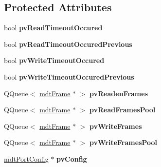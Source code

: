 \subsection*{Protected Attributes}
\begin{DoxyCompactItemize}
\item 
\hypertarget{classmdt_abstract_port_a9faa5966fcf4232b3d25034c0f67dd7c}{
bool {\bfseries pvReadTimeoutOccured}}
\label{classmdt_abstract_port_a9faa5966fcf4232b3d25034c0f67dd7c}

\item 
\hypertarget{classmdt_abstract_port_a2530e291d5ae4c1584595f9a5df7e9ff}{
bool {\bfseries pvReadTimeoutOccuredPrevious}}
\label{classmdt_abstract_port_a2530e291d5ae4c1584595f9a5df7e9ff}

\item 
\hypertarget{classmdt_abstract_port_ae5a003d280237700c8aa3cb6184e2d1b}{
bool {\bfseries pvWriteTimeoutOccured}}
\label{classmdt_abstract_port_ae5a003d280237700c8aa3cb6184e2d1b}

\item 
\hypertarget{classmdt_abstract_port_a8b65c0e26dc13147f02571ba74bef539}{
bool {\bfseries pvWriteTimeoutOccuredPrevious}}
\label{classmdt_abstract_port_a8b65c0e26dc13147f02571ba74bef539}

\item 
\hypertarget{classmdt_abstract_port_a412c3e4903bf7d90914cfeb273e82623}{
QQueue$<$ \hyperlink{classmdt_frame}{mdtFrame} $\ast$ $>$ {\bfseries pvReadenFrames}}
\label{classmdt_abstract_port_a412c3e4903bf7d90914cfeb273e82623}

\item 
\hypertarget{classmdt_abstract_port_a3d6bb9b420f64776d8fd077cf2b9b873}{
QQueue$<$ \hyperlink{classmdt_frame}{mdtFrame} $\ast$ $>$ {\bfseries pvReadFramesPool}}
\label{classmdt_abstract_port_a3d6bb9b420f64776d8fd077cf2b9b873}

\item 
\hypertarget{classmdt_abstract_port_a12cd5c1ba100b018539ed909a481d6dc}{
QQueue$<$ \hyperlink{classmdt_frame}{mdtFrame} $\ast$ $>$ {\bfseries pvWriteFrames}}
\label{classmdt_abstract_port_a12cd5c1ba100b018539ed909a481d6dc}

\item 
\hypertarget{classmdt_abstract_port_a67a8b1965f20a55ad115926aed0234b4}{
QQueue$<$ \hyperlink{classmdt_frame}{mdtFrame} $\ast$ $>$ {\bfseries pvWriteFramesPool}}
\label{classmdt_abstract_port_a67a8b1965f20a55ad115926aed0234b4}

\item 
\hypertarget{classmdt_abstract_port_a035d72bddbac47f405a8ecf0d2eeba66}{
\hyperlink{classmdt_port_config}{mdtPortConfig} $\ast$ {\bfseries pvConfig}}
\label{classmdt_abstract_port_a035d72bddbac47f405a8ecf0d2eeba66}


\end{DoxyCompactItemize}
